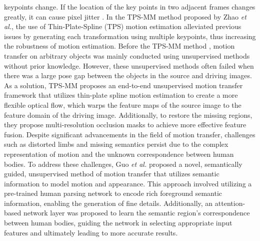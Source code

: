keypoints change. If the location of the key points in two adjacent frames changes greatly, it can cause pixel jitter \cite{zhao2022thin}. In the TPS-MM method proposed by Zhao \textit{et al.}, the use of Thin-Plate-Spline (TPS) motion estimation alleviated previous issues by generating each transformation using multiple keypoints, thus increasing the robustness of motion estimation. Before the TPS-MM method \cite{zhao2022thin}, motion transfer on arbitrary objects was mainly conducted using unsupervised methods without prior knowledge. However, these unsupervised methods often failed when there was a large pose gap between the objects in the source and driving images. As a solution, TPS-MM proposes an end-to-end unsupervised motion transfer framework that utilizes thin-plate spline motion estimation to create a more flexible optical flow, which warps the feature maps of the source image to the feature domain of the driving image. Additionally, to restore the missing regions, they propose multi-resolution occlusion masks to achieve more effective feature fusion. Despite significant advancements in the field of motion transfer, challenges such as distorted limbs and missing semantics persist due to the complex representation of motion and the unknown correspondence between human bodies. To address these challenges, Guo \textit{et al.} \cite{guo2024human} proposed a novel, semantically guided, unsupervised method of motion transfer that utilizes semantic information to model motion and appearance. This approach involved utilizing a pre-trained human parsing network to encode rich foreground semantic information, enabling the generation of fine details. Additionally, an attention-based network layer was proposed to learn the semantic region's correspondence between human bodies, guiding the network in selecting appropriate input features and ultimately leading to more accurate results.

